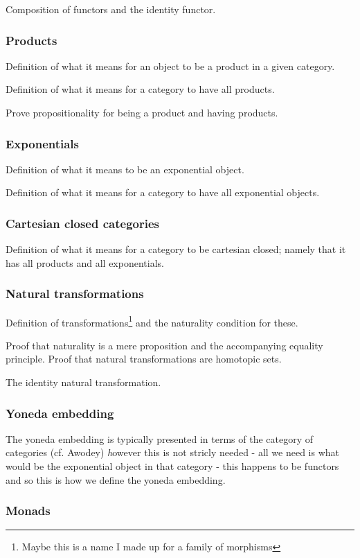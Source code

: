 Composition of functors and the identity functor.

\subsubsection{Products}
Definition of what it means for an object to be a product in a given category.

Definition of what it means for a category to have all products.

\WIP{} Prove propositionality for being a product and having products.

\subsubsection{Exponentials}
Definition of what it means to be an exponential object.

Definition of what it means for a category to have all exponential objects.

\subsubsection{Cartesian closed categories}
Definition of what it means for a category to be cartesian closed; namely that
it has all products and all exponentials.

\subsubsection{Natural transformations}
Definition of transformations\footnote{Maybe this is a name I made up for a
  family of morphisms} and the naturality condition for these.

Proof that naturality is a mere proposition and the accompanying equality
principle. Proof that natural transformations are homotopic sets.

The identity natural transformation.

\subsubsection{Yoneda embedding}

The yoneda embedding is typically presented in terms of the category of
categories (cf. Awodey) \emph however this is not stricly needed - all we need
is what would be the exponential object in that category - this happens to be
functors and so this is how we define the yoneda embedding.

\subsubsection{Monads}


